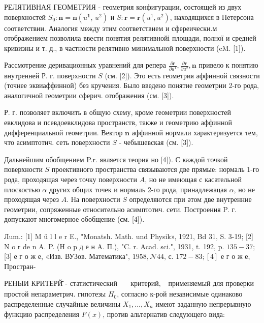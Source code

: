 \documentclass[10pt]{article}
\begin{document}
РЕЛЯТИВНАЯ ГЕОМЕТРИЯ - геометрия конфигурации, состоящей из двух поверхностей $S_{0}: \boldsymbol{n}=\boldsymbol{n}\left(u^{\mathbf{1}}\right.$, $\left.u^{2}\right)$ и $S: \boldsymbol{r}=\boldsymbol{r}\left(u^{1}, u^{2}\right)$, находящихся в Петерсона соответствии. Аналогия между этим соответствием и сфереически.м отображением позволила ввести понятия релятивнойі площади, полної и средней кривизны и т. д., в частности релятивно минимальной поверхности (cM. [1]).



Рассмотрение деривационных уравнений для репера $\frac{\partial \boldsymbol{r}}{\partial u^{1}}, \frac{\partial \boldsymbol{r}}{\partial u^{2}}, \boldsymbol{n}$ привело к понятию внутренней Р. г. поверхности $S$ (см. [2]). Это есть геометрия аффинной связности (точнее эквиаффинной) без кручения. Было введено понятие геометрии 2-го рода, аналогичной геометрии сферич. отображения (см. [3]).



Р. г. позволяет включить в общую схему, кроме геометрии поверхностей евклидова и псевдоевклидова пространств, также и геометрию аффинной дифференциальной геометрии. Вектор $\boldsymbol{n}$ аффинной нормали характеризуется тем, что асимптотич. сеть поверхности $S$ - чебышевская (см. [3]).



Дальнейшим обобщением P.r. является теория но [4]). С каждой точкой поверхности $S$ проективного пространства связываются две прямые: нормаль 1-го рода, проходящая через точку поверхности $A$, но не имеющая с касательной плоскостью $\alpha$ других общих точек и нормаль 2-го рода, принадлежацая $\alpha$, но не проходящая через $A$. На поверхности $S$ определяются при әтом две внутренние геометрии, сопряженные относительно асимптотич. сети. Построения P. г. допускают многомерное обобщение (см. [4]).



Лum.: [1] M ü l l e r E., "Monatsh. Math. und Physik», 1921, Bd 31, S. 3-19; [2] N o r de n A. P. (H o p д е н A. П.), "C. r. Acad. sci.", 1931, t. 192, p. $135-37 ;$ [3] е г о ж е, «Изв. ВУЗов. Математика", $1958, \mathcal{N} 44$, с. $172-83 ;[4]$ е г о ж е, Простран-



РЕНЫИ КРИТЕРЙ̆ - статистический $\begin{aligned} & \text { критерий, }\end{aligned}$ применяемый для проверки простой непараметрич. гипотезы $H_{0}$, согласно к-рой независимые одинаково распределенные случайные величины $X_{1}, \ldots, X_{n}$ имеют заданную непрерывную функцию распределения $F(x)$, против альтернатив следующего вида:
\end{document}
